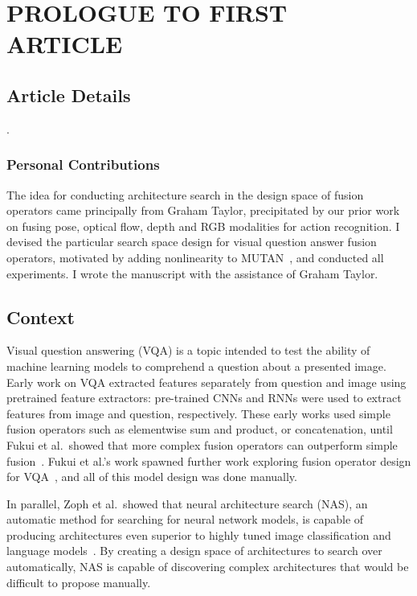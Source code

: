 \chapter{PROLOGUE TO FIRST ARTICLE}


\section{Article Details}

.

\subsection{Personal Contributions}

The idea for conducting architecture search in the design space of fusion
operators came principally from Graham Taylor, precipitated by our prior work
on fusing pose, optical flow, depth and RGB modalities for action recognition.
I devised the particular search space design for visual question answer fusion
operators, motivated by adding nonlinearity to MUTAN~\cite{ben2017mutan}, and
conducted all experiments.
I wrote the manuscript with the assistance of Graham Taylor.


\section{Context}

Visual question answering (VQA) is a topic intended to test the ability of
machine learning models to comprehend a question about a presented image.
Early work on VQA extracted features separately from question and image using
pretrained feature extractors: pre-trained CNNs and RNNs were used to extract
features from image and question, respectively.
These early works used simple fusion operators such as elementwise sum and
product, or concatenation, until Fukui et al.\ showed that more complex fusion
operators can outperform simple fusion~\cite{fukui2016multimodalCB}.
Fukui et al.'s work spawned further work exploring fusion operator design for
VQA~\cite{Kim2017, ben2017mutan}, and all of this model design was done
manually.

In parallel, Zoph et al.\ showed that neural architecture
search (NAS), an automatic method for searching for neural network models, is
capable of producing architectures even superior to highly tuned image
classification and language models~\cite{zoph2016neural}.
By creating a design space of architectures to search over automatically, NAS
is capable of discovering complex architectures that would be difficult to
propose manually.

